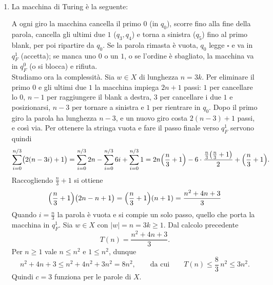 \begin{sol}\
\begin{enumerate}

    \item  La macchina di Turing è la seguente:

\begin{center}
\end{center}
A ogni giro la macchina cancella il primo $0$ (in $q_0$), scorre fino alla fine
della parola, cancella gli ultimi due $1$ ($q_3,q_4$) e torna a sinistra ($q_5$)
fino al primo blank, per poi ripartire da $q_0$. Se la parola rimasta è vuota,
$q_0$ legge $\square$ e va in $q_F^1$ (accetta); se manca uno $0$ o un $1$, o se
l'ordine è sbagliato, la macchina va in $q_F^0$ (o si blocca) e rifiuta.
\\
Studiamo ora la complessità.
Sia $w\in X$ di lunghezza $n=3k$. Per eliminare il primo $0$ e gli ultimi due $1$
la macchina impiega $2n+1$ passi: $1$ per cancellare lo $0$, $n-1$ per
raggiungere il blank a destra, $3$ per cancellare i due $1$ e posizionarsi, $n-3$
per tornare a sinistra e $1$ per rientrare in $q_0$. Dopo il primo giro la
parola ha lunghezza $n-3$, e un nuovo giro costa $2(n-3)+1$ passi, e così via.
Per ottenere la stringa vuota e fare il passo finale verso $q_F^1$ servono
quindi
\[
\sum_{i=0}^{n/3}\bigl(2(n-3i)+1\bigr)
= \sum_{i=0}^{n/3}2n-\sum_{i=0}^{n/3}6i+\sum_{i=0}^{n/3}1
= 2n\Bigl(\frac n3+1\Bigr)-6\cdot\frac{\frac n3\bigl(\frac n3+1\bigr)}{2}+\Bigl(\frac n3+1\Bigr).
\]
Raccogliendo $\frac n3+1$ si ottiene
\[
\Bigl(\frac n3+1\Bigr)\bigl(2n-n+1\bigr)=\Bigl(\frac n3+1\Bigr)(n+1)
=\frac{n^2+4n+3}{3}
\]
Quando $i=\frac n3$ la parola è vuota e si compie un solo passo, quello che porta
la macchina in $q_F^1$.
Sia $w\in X$ con $|w|=n=3k\ge 1$. Dal calcolo precedente
\[
T(n)=\frac{n^2+4n+3}{3}.
\]
Per $n\ge 1$ vale $n\le n^2$ e $1\le n^2$, dunque
\[
n^2+4n+3\le n^2+4n^2+3n^2=8n^2,
\qquad\text{da cui}\qquad
T(n)\le \frac{8}{3}\,n^2\le 3n^2 .
\]
Quindi $c=3$ funziona per le parole di $X$.


\end{enumerate}
\end{sol}
